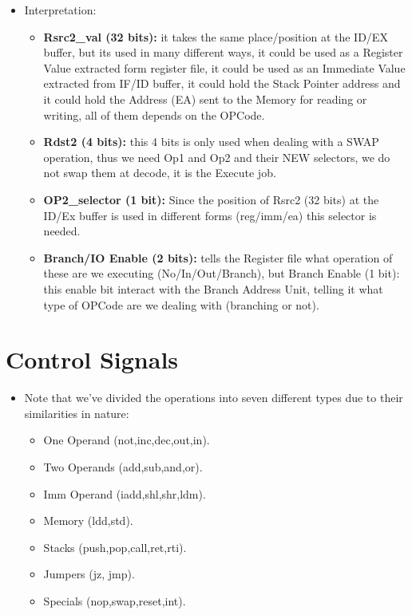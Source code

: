 \documentclass[12pt]{report}
\begin{document}
\begin{itemize}
    \item Interpretation:
    \begin{itemize}
        \item \textbf{Rsrc2\_val (32 bits):} it takes the same place/position at the ID/EX buffer, but its used in many different ways, it could be used as a Register Value extracted form register file, it could be used as an Immediate Value extracted from IF/ID buffer, it could hold the Stack Pointer address and it could hold the Address (EA) sent to the Memory for reading or writing, all of them depends on the OPCode.
        \item \textbf{Rdst2 (4 bits):} this 4 bits is only used when dealing with a SWAP operation, thus we need Op1 and Op2 and their NEW selectors, we do not swap them at decode, it is the Execute job.
        \item \textbf{OP2\_selector (1 bit):} Since the position of Rsrc2 (32 bits) at the ID/Ex buffer is used in different forms (reg/imm/ea) this selector is needed.
        \item  \textbf{Branch/IO Enable (2 bits):} tells the Register file what operation of these are we executing (No/In/Out/Branch), but Branch Enable (1 bit): this enable bit interact with the Branch Address Unit, telling it what type of OPCode are we dealing with (branching or not).
    \end{itemize}
\end{itemize}

\section{Control Signals}

\begin{itemize}
    \item Note that we've divided the operations into seven different types due to their similarities in nature:
    \begin{itemize}
        \item One Operand (not,inc,dec,out,in).
        \item Two Operands (add,sub,and,or).
        \item Imm Operand (iadd,shl,shr,ldm).
        \item Memory (ldd,std).
        \item Stacks (push,pop,call,ret,rti).
        \item Jumpers (jz, jmp).
        \item Specials (nop,swap,reset,int).
    \end{itemize}
\end{itemize}    
    
\end{document}
